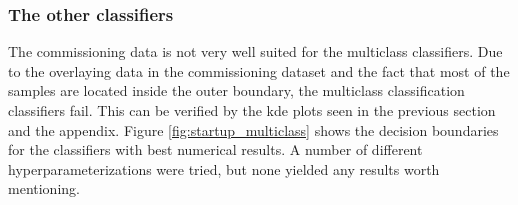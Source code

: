         \clearpage
        \subsubsection{The other classifiers}
            The commissioning data is not very well suited for the multiclass classifiers. Due to the overlaying data in the commissioning dataset and the fact that most of the samples are located inside the outer boundary, the multiclass classification classifiers fail. This can be verified by the kde plots seen in the previous section and the appendix. Figure \ref{fig:startup_multiclass} shows the decision boundaries for the classifiers with best numerical results. A number of different hyperparameterizations were tried, but none yielded any results worth mentioning.
            
            
